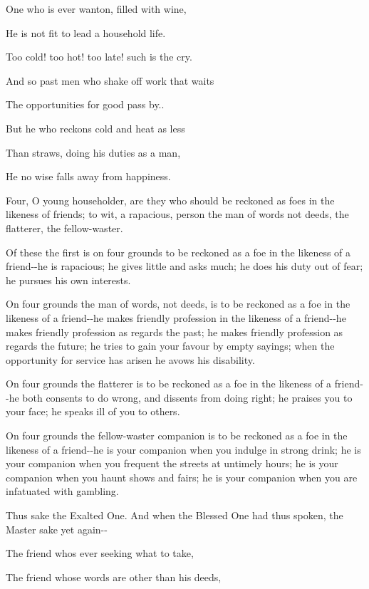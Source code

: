 \documentclass[12pt,twoside]{article}
\begin{document}
One who is ever wanton, filled with wine,

He is not fit to lead a household life.


\bigskip

Too cold! too hot! too late! such is the cry.

And so past men who shake off work that waits

The opportunities for good pass by..

But he who reckons cold and heat as less

Than straws, doing his duties as a man,

He no wise falls away from happiness.


\bigskip

Four, O young householder, are they who should be reckoned as foes in
the likeness of friends; to wit, a rapacious, person the man of words
not deeds, the flatterer, the fellow{}-waster.

Of these the first is on four grounds to be reckoned as a foe in the
likeness of a friend{}-{}-he is rapacious; he gives little and asks
much; he does his duty out of fear; he pursues his own interests.

On four grounds the man of words, not deeds, is to be reckoned as a foe
in the likeness of a friend{}-{}-he makes friendly profession in the
likeness of a friend{}-{}-he makes friendly profession as regards the
past; he makes friendly profession as regards the future; he tries to
gain your favour by empty sayings; when the opportunity for service has
arisen he avows his disability.

On four grounds the flatterer is to be reckoned as a foe in the likeness
of a friend{}-{}-he both consents to do wrong, and dissents from doing
right; he praises you to your face; he speaks ill of you to others.

On four grounds the fellow{}-waster companion is to be reckoned as a foe
in the likeness of a friend{}-{}-he is your companion when you indulge
in strong drink; he is your companion when you frequent the streets at
untimely hours; he is your companion when you haunt shows and fairs; he
is your companion when you are infatuated with gambling.

Thus sake the Exalted One. And when the Blessed One had thus spoken, the
Master sake yet again{}-{}-


\bigskip

The friend who{\textquotesingle}s ever seeking what to take,

The friend whose words are other than his deeds,
\end{document}
